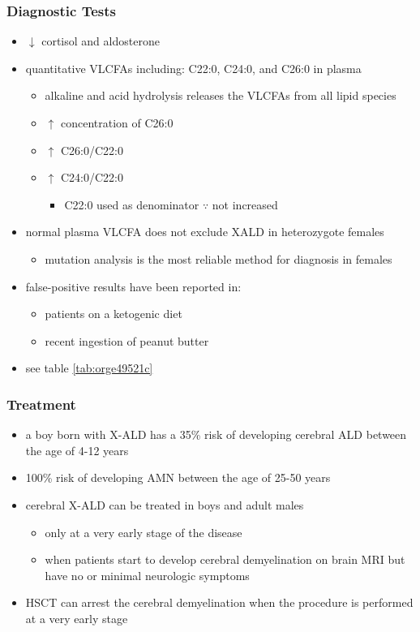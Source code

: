 \documentclass[12pt]{scrartcl}
\begin{document}
\subsubsection{Diagnostic Tests}
\label{sec:org49a9257}
\begin{itemize}
\item \(\downarrow\) cortisol and aldosterone
\item quantitative VLCFAs including: C22:0, C24:0, and C26:0 in plasma
\begin{itemize}
\item alkaline and acid hydrolysis releases the VLCFAs from all lipid
species
\item \(\uparrow\) concentration of C26:0
\item \(\uparrow\) C26:0/C22:0
\item \(\uparrow\) C24:0/C22:0
\begin{itemize}
\item C22:0 used as denominator \(\because\) not increased
\end{itemize}
\end{itemize}
\item normal plasma VLCFA does not exclude XALD in heterozygote females
\begin{itemize}
\item mutation analysis is the most reliable method for diagnosis in females
\end{itemize}
\item false-positive results have been reported in:
\begin{itemize}
\item patients on a ketogenic diet
\item recent ingestion of peanut butter
\end{itemize}
\item see table \ref{tab:orge49521c}
\end{itemize}
\subsubsection{Treatment}
\label{sec:org9626216}
\begin{itemize}
\item a boy born with X-ALD has a 35\% risk of developing cerebral ALD
between the age of 4-12 years
\item 100\% risk of developing AMN between the age of 25-50 years
\item cerebral X-ALD can be treated in boys and adult males
\begin{itemize}
\item only at a very early stage of the disease
\item when patients start to develop cerebral demyelination on brain MRI
but have no or minimal neurologic symptoms
\end{itemize}
\item HSCT can arrest the cerebral demyelination when the procedure is
performed at a very early stage
\end{itemize}
\end{document}
